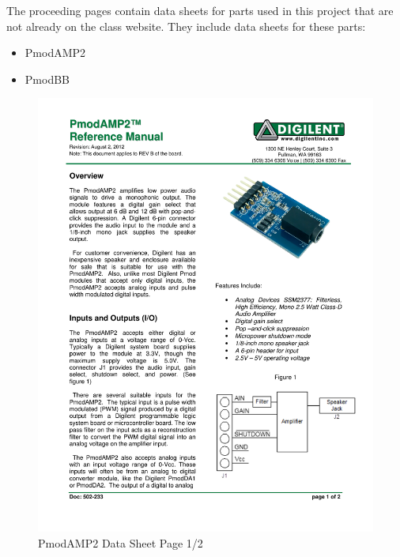 \documentclass{article}
\begin{document}
  	The proceeding pages contain data sheets for parts used in this project that are not already on the class website. They include data sheets for these parts:

	\begin{itemize}
		\item PmodAMP2
		\item PmodBB
    \end{itemize}  	

	\begin{figure}[H]
	  	\centering
	  	\includegraphics[width=6.5in]{additionalDataSheets/PmodAMP2}
	  	\caption{PmodAMP2 Data Sheet Page 1/2}
	\end{figure}
\end{document}
